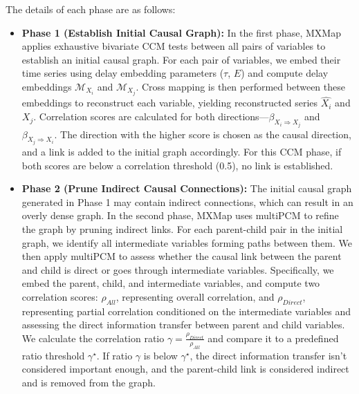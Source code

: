 The details of each phase are as follows:
\begin{itemize}
    \item \textbf{Phase 1 (Establish Initial Causal Graph):} 
    In the first phase, MXMap applies exhaustive bivariate CCM tests between all pairs of variables to establish an initial causal graph. For each pair of variables, we embed their time series using delay embedding parameters ($\tau$, $E$) and compute delay embeddings $\mathcal{M}_{X_i}$ and $\mathcal{M}_{X_j}$. Cross mapping is then performed between these embeddings to reconstruct each variable, yielding reconstructed series $\hat{X_i}$ and $\hat{X_j}$. Correlation scores are calculated for both directions—$\beta_{X_i \Rightarrow X_j}$ and $\beta_{X_j \Rightarrow X_i}$. The direction with the higher score is chosen as the causal direction, and a link is added to the initial graph accordingly. For this CCM phase, if both scores are below a correlation threshold (0.5), no link is established.
    \item \textbf{Phase 2 (Prune Indirect Causal Connections):} The initial causal graph generated in Phase 1 may contain indirect connections, which can result in an overly dense graph. In the second phase, MXMap uses multiPCM to refine the graph by pruning indirect links. For each parent-child pair in the initial graph, we identify all intermediate variables forming paths between them. We then apply multiPCM to assess whether the causal link between the parent and child is direct or goes through intermediate variables. Specifically, we embed the parent, child, and intermediate variables, and compute two correlation scores: $\rho_{All}$, representing overall correlation, and $\rho_{Direct}$, representing partial correlation conditioned on the intermediate variables and assessing the direct information transfer between parent and child variables. We calculate the correlation ratio $\gamma = \frac{\rho_{Direct}}{\rho_{All}}$ and compare it to a predefined ratio threshold $\gamma^\star$. If ratio $\gamma$ is below $\gamma^\star$, the direct information transfer isn't considered important enough, and the parent-child link is considered indirect and is removed from the graph.
\end{itemize}



